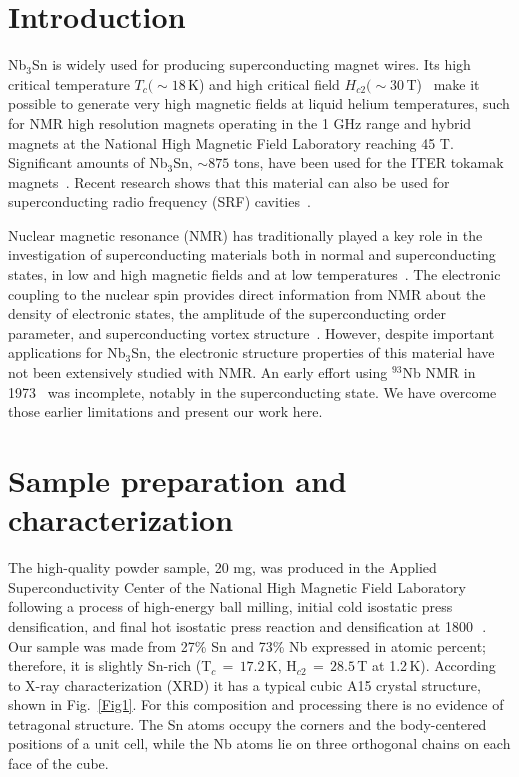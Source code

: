 \documentclass[aps,prl,reprint,superscriptaddress]{revtex4-2}
\begin{document}
	\section{Introduction}
	Nb$_3$Sn is widely used for producing superconducting magnet wires. Its high critical temperature $T_c (\sim18\,$K) and high critical field $H_{c2} (\sim30\,$T)~\cite{Zho.11} make it possible to generate very high magnetic fields at liquid helium temperatures, such for NMR high resolution magnets operating in the 1 GHz range and hybrid magnets at the National High Magnetic Field Laboratory reaching 45 T. Significant amounts of Nb$_3$Sn,  $\sim 875$ tons, have been used for the ITER tokamak magnets~\cite{Dev.14}.  
Recent research shows that this material can also be used for superconducting radio frequency (SRF) cavities~\cite{Pos.21}.
	
	Nuclear magnetic resonance (NMR) has traditionally played a key role in the investigation of superconducting materials both in normal and superconducting states, in low and high magnetic fields and at low temperatures~\cite{Mac.76}. 
The electronic coupling to the nuclear spin provides direct information from NMR about the density of electronic states, the amplitude of the superconducting order parameter, and superconducting vortex structure~\cite{Mit.01}.
However, despite  important applications for Nb$_3$Sn, the electronic structure properties of this material have not been extensively studied with NMR. An early effort using $^{93}$Nb NMR in 1973~\cite{Fra.73} was incomplete, notably in the superconducting state.  We have overcome those earlier limitations and present our work here.
	
	\section{Sample preparation and characterization}
	The high-quality powder sample, 20 mg, was produced in the Applied Superconductivity Center of the National High Magnetic Field Laboratory following a process of high-energy ball milling, initial cold isostatic press densification, and final hot isostatic press reaction and densification at 1800\,\textcelsius~\cite{Zho.11}. Our sample was made from 27\% Sn and 73\% Nb expressed in atomic percent; therefore, it is slightly Sn-rich (T$_c\,=\,17.2\,$K, H$_{c2}\,=\,28.5\,$T at 1.2\,K). According to X-ray characterization (XRD) it has a typical cubic A15 crystal structure, shown in Fig.~\ref{Fig1}.  For this composition and processing there is no evidence of tetragonal structure. The Sn atoms occupy the corners and the body-centered positions of a unit cell, while the Nb atoms lie on three orthogonal chains on each face of the cube. 
\end{document}
